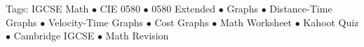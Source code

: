 \documentclass[11pt,a4paper]{article}
\begin{document}
\vspace{14pt}
\begin{center}
  \sffamily\scriptsize\textcolor{textmuted}{
    Tags: IGCSE Math $\bullet$ CIE 0580 $\bullet$ 0580 Extended $\bullet$ Graphs $\bullet$ Distance-Time Graphs $\bullet$ Velocity-Time Graphs $\bullet$ Cost Graphs $\bullet$ Math Worksheet $\bullet$ Kahoot Quiz $\bullet$ Cambridge IGCSE $\bullet$ Math Revision
  }
\end{center}
\end{document}
